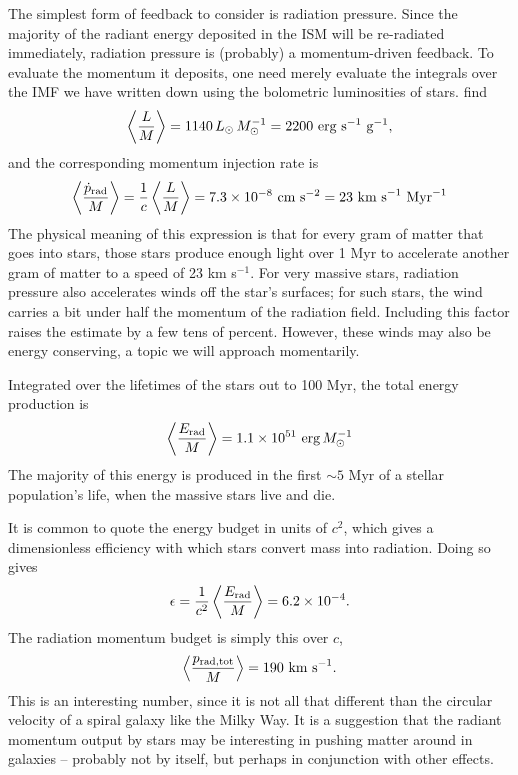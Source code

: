 The simplest form of feedback to consider is radiation pressure. Since the majority of the radiant energy deposited in the ISM will be re-radiated immediately, radiation pressure is (probably) a momentum-driven feedback. To evaluate the momentum it deposits, one need merely evaluate the integrals over the IMF we have written down using the bolometric luminosities of stars. \citet{murray10b} find
\begin{equation}
\left\langle \frac{L}{M}\right \rangle = 1140 \,L_{\odot}\,M_{\odot}^{-1} = 2200\mbox{ erg s}^{-1}\mbox{ g}^{-1},
\end{equation}
and the corresponding momentum injection rate is
\begin{equation}
\left\langle \frac{\dot{p}_{\rm rad}}{M}\right \rangle = \frac{1}{c} \left\langle \frac{L}{M}\right \rangle = 7.3\times 10^{-8}\mbox{ cm s}^{-2} = 23\mbox{ km s}^{-1}\mbox{ Myr}^{-1}
\end{equation}
The physical meaning of this expression is that for every gram of matter that goes into stars, those stars produce enough light over 1 Myr to accelerate another gram of matter to a speed of 23 km s$^{-1}$. For very massive stars, radiation pressure also accelerates winds off the star's surfaces; for such stars, the wind carries a bit under half the momentum of the radiation field. Including this factor raises the estimate by a few tens of percent.  However, these winds may also be energy conserving, a topic we will approach momentarily.

Integrated over the lifetimes of the stars out to 100 Myr, the total energy production is
\begin{equation}
\left\langle \frac{E_{\rm rad}}{M}\right\rangle = 1.1\times 10^{51}\mbox{ erg}\,M_{\odot}^{-1}
\end{equation}
The majority of this energy is produced in the first $\sim 5$ Myr of a stellar population's life, when the massive stars live and die.

It is common to quote the energy budget in units of $c^2$, which gives a dimensionless efficiency with which stars convert mass into radiation. Doing so gives
\begin{equation}
\epsilon = \frac{1}{c^2} \left\langle \frac{E_{\rm rad}}{M}\right\rangle = 6.2\times 10^{-4}.
\end{equation}
The radiation momentum budget is simply this over $c$,
\begin{equation}
\left\langle \frac{p_{\rm rad,tot}}{M}\right\rangle = 190\mbox{ km s}^{-1}.
\end{equation}
This is an interesting number, since it is not all that different than the circular velocity of a spiral galaxy like the Milky Way. It is a suggestion that the radiant momentum output by stars may be interesting in pushing matter around in galaxies -- probably not by itself, but perhaps in conjunction with other effects.

